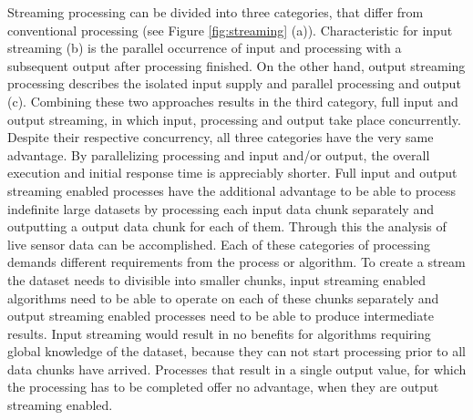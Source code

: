 	Streaming processing can be divided into three categories, that differ from conventional processing (see Figure \ref{fig:streaming} (a)). Characteristic for input streaming (b) is the parallel occurrence of input and processing with a subsequent output after processing finished. On the other hand, output streaming processing describes the isolated input supply and parallel processing and output (c). Combining these two approaches results in the third category, full input and output streaming, in which input, processing and output take place concurrently. Despite their respective concurrency, all three categories have the very same advantage. By parallelizing processing and input and/or output, the overall execution and initial response time is appreciably shorter. Full input and output streaming enabled processes have the additional advantage to be able to process indefinite large datasets by processing each input data chunk separately and outputting a output data chunk for each of them. Through this the analysis of live sensor data can be accomplished.
	Each of these categories of processing demands different requirements from the process or algorithm. To create a stream the dataset needs to divisible into smaller chunks, input streaming enabled algorithms need to be able to operate on each of these chunks separately and output streaming enabled processes need to be able to produce intermediate results. Input streaming would result in no benefits for algorithms requiring global knowledge of the dataset, because they can not start processing prior to all data chunks have arrived. Processes that result in a single output value, for which the processing has to be completed offer no advantage, when they are output streaming enabled.

